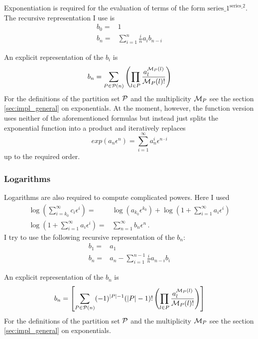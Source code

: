 \documentclass{article}
\begin{document}
Exponentiation is required for the evaluation of terms of the form
$\text{series\_1}^{\text{series\_2}}$.
The recursive representation I use is
\begin{align}
  \label{eq:exp_rec}
b_0=&1\\
b_n =&  \sum_{i=1}^{n} \frac{i}{n} a_{i}b_{n-i}
\end{align}

An explicit representation of the $b_i$ is
\begin{equation}
  \label{eq:exp}
  \begin{split}
    b_n=
\sum_{P \in {\cal P}(n)} \left(\prod_{l \in P} \frac{a^{{\cal M}_P(l)}_l}{{\cal M}_P(l)!} \right)
  \end{split}
\end{equation}
For the definitions of the partition set ${\cal P}$ and the
multiplicity ${\cal M}_P$ see the section \ref{sec:impl_general} on
exponentials.
 At the moment, however, the function version uses neither of the
 aforementioned formulas but instead just splits the
 exponential function into a product and iteratively replaces
 \begin{equation}
   \label{eq:exp_simple}
   exp(a_n \epsilon^n)=\sum_{i=1}^\infty a_n^i \epsilon^{n\cdot i}
 \end{equation}
up to the required order.


\subsubsection{Logarithms}
\label{sec:impl_log}

Logarithms are also required to compute complicated powers. Here I used
\begin{align}
  \label{eq:log}
\log\left(\sum_{i=k_0}^{\infty}c_i \epsilon^i\right)=&\log\left(a_{k_0}\epsilon^{k_0}\right)+\log\left(1+\sum_{i=1}^{\infty}a_i \epsilon^i\right)\\
\log\left(1+\sum_{i=1}^{\infty}a_i \epsilon^i\right)=&\sum_{n=1}^\infty
b_n\epsilon^n\,.
\end{align}
I try to use the following recursive representation of the $b_n$:
\begin{align}
  \label{eq:log_rec}
b_1=&a_1\\
b_n =& a_n - \sum_{i=1}^{n-1} \frac{i}{n} a_{n-i}b_{i}
\end{align}

An explicit representation of the $b_n$ is
\begin{equation}
  \label{eq:log_expl}
  b_n=\left[\sum_{P \in {\cal P}(n)} (-1)^{|P|-1}(|P|-1)!\left(\prod_{l \in P} \frac{a^{{\cal M}_P(l)}_l}{{\cal M}_P(l)!} \right)\right]
\end{equation}
For the definitions of the partition set ${\cal P}$ and the
multiplicity ${\cal M}_P$ see the section \ref{sec:impl_general} on
exponentials.
\end{document}
